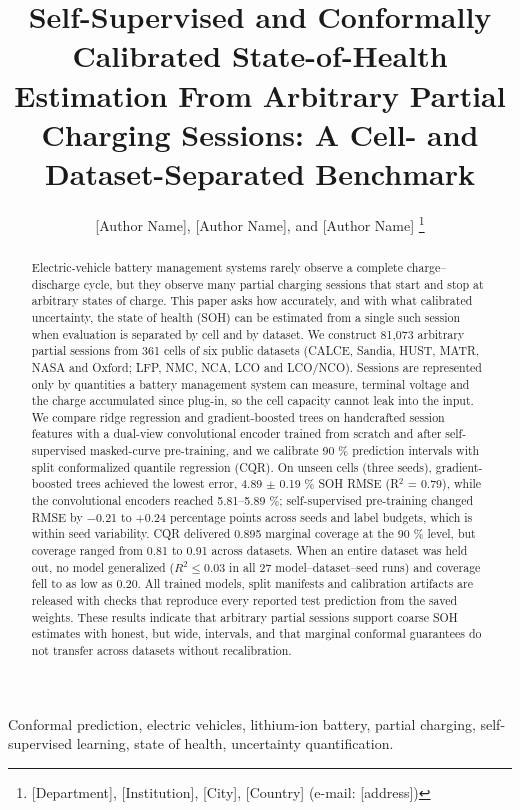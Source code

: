 \documentclass[journal]{IEEEtran}
\begin{document}
\title{Self-Supervised and Conformally Calibrated State-of-Health Estimation From Arbitrary Partial Charging Sessions: A Cell- and Dataset-Separated Benchmark}
\author{{[}Author Name{]}, {[}Author Name{]}, and {[}Author Name{]}%
\thanks{{[}Department{]}, {[}Institution{]}, {[}City{]}, {[}Country{]} (e-mail: {[}address{]})}}
\maketitle
\begin{abstract}
Electric-vehicle battery management systems rarely observe a complete charge--discharge cycle, but they observe many partial charging sessions that start and stop at arbitrary states of charge. This paper asks how accurately, and with what calibrated uncertainty, the state of health (SOH) can be estimated from a single such session when evaluation is separated by cell and by dataset. We construct 81,073 arbitrary partial sessions from 361 cells of six public datasets (CALCE, Sandia, HUST, MATR, NASA and Oxford; LFP, NMC, NCA, LCO and LCO/NCO). Sessions are represented only by quantities a battery management system can measure, terminal voltage and the charge accumulated since plug-in, so the cell capacity cannot leak into the input. We compare ridge regression and gradient-boosted trees on handcrafted session features with a dual-view convolutional encoder trained from scratch and after self-supervised masked-curve pre-training, and we calibrate 90 \% prediction intervals with split conformalized quantile regression (CQR). On unseen cells (three seeds), gradient-boosted trees achieved the lowest error, 4.89 $\pm$ 0.19 \% SOH RMSE (R$^2$ = 0.79), while the convolutional encoders reached 5.81--5.89 \%; self-supervised pre-training changed RMSE by $-$0.21 to +0.24 percentage points across seeds and label budgets, which is within seed variability. CQR delivered 0.895 marginal coverage at the 90 \% level, but coverage ranged from 0.81 to 0.91 across datasets. When an entire dataset was held out, no model generalized (\(R^2\le0.03\) in all 27 model--dataset--seed runs) and coverage fell to as low as 0.20. All trained models, split manifests and calibration artifacts are released with checks that reproduce every reported test prediction from the saved weights. These results indicate that arbitrary partial sessions support coarse SOH estimates with honest, but wide, intervals, and that marginal conformal guarantees do not transfer across datasets without recalibration.
\end{abstract}
\begin{IEEEkeywords}
Conformal prediction, electric vehicles, lithium-ion battery, partial charging, self-supervised learning, state of health, uncertainty quantification.
\end{IEEEkeywords}
\end{document}
